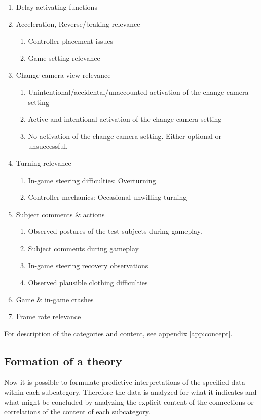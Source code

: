 \begin{enumerate}
	\item Delay activating functions
	\item Acceleration, Reverse/braking relevance
	\begin{enumerate}
		\item Controller placement issues
		\item Game setting relevance
	\end{enumerate}
	\item Change camera view relevance
	\begin{enumerate}
		\item Unintentional/accidental/unaccounted activation of the change camera setting
		\item Active and intentional activation of the change camera setting
		\item No activation of the change camera setting. Either optional or unsuccessful.
	\end{enumerate}
	\item Turning relevance
	\begin{enumerate}
		\item In-game steering difficulties: Overturning
		\item Controller mechanics: Occasional unwilling turning 
	\end{enumerate}
	\item Subject comments \& actions
	\begin{enumerate}
		\item Observed postures of the test subjects during gameplay.
		\item Subject comments during gameplay
		\item In-game steering recovery observations
		\item Observed plausible clothing difficulties
	\end{enumerate}
	\item Game \& in-game crashes
	\item Frame rate relevance
\end{enumerate}

For description of the categories and content, see appendix \ref{app:concept}.


\subsection*{Formation of a theory}
Now it is possible to formulate predictive interpretations of the specified data within each subcategory. 
Therefore the data is analyzed for what it indicates and what might be concluded by analyzing the explicit content of the connections or correlations of the content of each subcategory.
\bigskip

